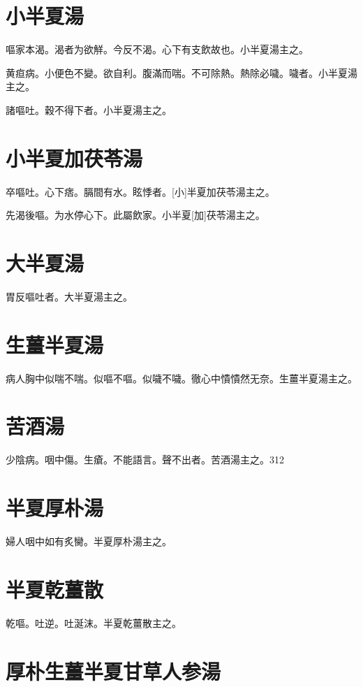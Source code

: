 \documentclass[12pt,twoside,UTF8,b5paper]{ctexbook}
\begin{document}
\section{小半夏湯}

嘔家本渴。渴者为欲觧。今反不渴。心下有支飲故也。小半夏湯主之。

黄疸病。小便色不變。欲自利。腹滿而喘。不可除熱。熱除必噦。噦者。小半夏湯主之。

諸嘔吐。穀不得下者。小半夏湯主之。

\section{小半夏加茯苓湯}

卒嘔吐。心下痞。膈間有水。眩悸者。[小]半夏加茯苓湯主之。

先渴後嘔。为水停心下。此屬飲家。小半夏[加]茯苓湯主之。

\section{大半夏湯}

胃反嘔吐者。大半夏湯主之。

\section{生薑半夏湯}

病人胸中似喘不喘。似嘔不嘔。似噦不噦。徹心中憒憒然无奈。生薑半夏湯主之。

\section{苦酒湯}

少陰病。咽中傷。生瘡。不能語言。聲不出者。苦酒湯主之。312

\section{半夏厚朴湯}

婦人咽中如有炙臠。半夏厚朴湯主之。

\section{半夏乾薑散}

乾嘔。吐逆。吐涎沫。半夏乾薑散主之。

\section{厚朴生薑半夏甘草人参湯}
\end{document}

